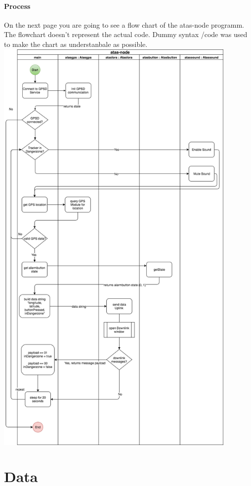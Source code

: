 \documentclass[a4paper,11pt, oneside]{report}
\theoremstyle{definition}
\begin{document}
\subsubsection{Process}
On the next page you are going to see a flow chart of the atas-node programm. The flowchart doesn't represent the actual code. Dummy syntax /code was used to make the chart as understanbale as possible.
\newpage
\includegraphics[width=0.88\textwidth]{img/atas-node-process}\\


\chapter{Data}
\end{document}
